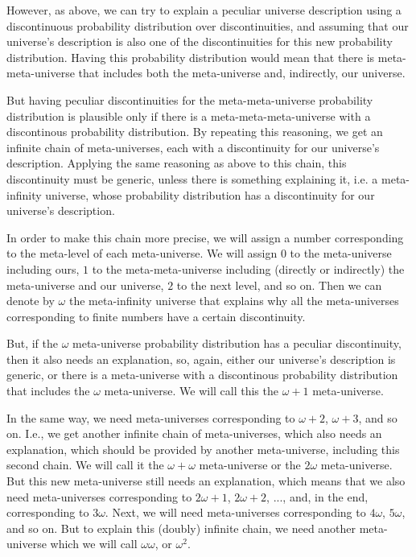 \documentclass[a4paper
,draft
]{article}
\begin{document}
However, as above, we can try to explain a peculiar universe description
using a discontinuous probability distribution over discontinuities,
and assuming that our universe's description is also one of the
discontinuities for this new probability distribution.
Having this probability distribution would mean that there is
meta-meta-universe that includes both the meta-universe and, indirectly,
our universe.

But having peculiar discontinuities for the meta-meta-universe probability
distribution is plausible only if there is a meta-meta-meta-universe
with a discontinous probability distribution.
By repeating this reasoning, we get an infinite chain of meta-universes,
each with a discontinuity for our universe's
description.
Applying the same reasoning as above to this chain, this discontinuity
must be generic,
unless there is something explaining it, i.e. a meta-infinity universe,
whose probability distribution has a discontinuity for our universe's
description.

In order to make this chain more precise, we will assign a number corresponding
to the meta-level of each meta-universe.
We will assign $0$ to the meta-universe including ours, $1$ to the
meta-meta-universe including (directly or indirectly) the meta-universe and our
universe, $2$ to the next level, and so on.
Then we can denote by $\omega$ the meta-infinity universe that explains why all
the meta-universes corresponding to finite numbers have a certain discontinuity.

But, if the $\omega$ meta-universe probability distribution has a peculiar
discontinuity, then it also needs an explanation, so, again,
either our universe's
description is generic, or there is a meta-universe with a discontinous
probability distribution that includes the
$\omega$ meta-universe.
We will call this the $\omega + 1$ meta-universe.

In the same way, we need meta-universes corresponding to $\omega + 2$,
$\omega + 3$, and so on.
I.e., we get another infinite chain of meta-universes, which also needs an
explanation, which should be provided by another meta-universe, including this
second chain. We will call it the $\omega + \omega$ meta-universe
or the $2\omega$ meta-universe.
But this new meta-universe still needs an explanation,
which means that we also need
meta-universes corresponding to $2\omega + 1$, $2\omega + 2$, ..., and,
in the end, corresponding to $3\omega$.
Next, we will need meta-universes
corresponding to $4\omega$, $5\omega$, and so on.
But to explain this (doubly) infinite chain,
we need another meta-universe which we
will call $\omega\omega$, or $\omega^2$.
\end{document}

